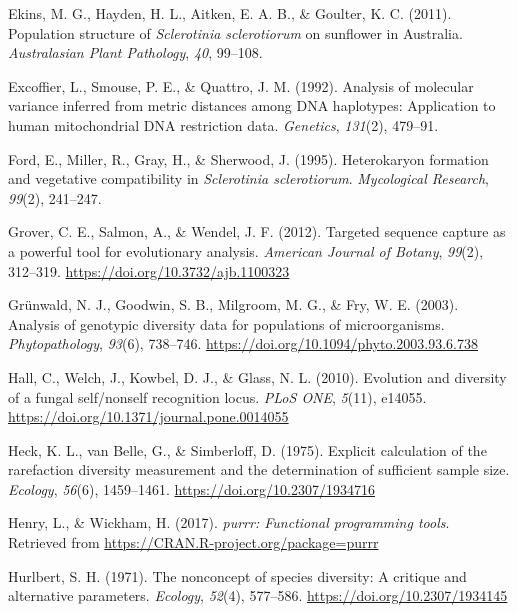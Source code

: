 \hypertarget{ref-ekins2011population}{}
Ekins, M. G., Hayden, H. L., Aitken, E. A. B., \& Goulter, K. C. (2011).
Population structure of \emph{Sclerotinia sclerotiorum} on sunflower in
Australia. \emph{Australasian Plant Pathology}, \emph{40}, 99--108.

\hypertarget{ref-excoffier1992analysis}{}
Excoffier, L., Smouse, P. E., \& Quattro, J. M. (1992). Analysis of
molecular variance inferred from metric distances among DNA haplotypes:
Application to human mitochondrial DNA restriction data.
\emph{Genetics}, \emph{131}(2), 479--91.

\hypertarget{ref-ford1995heterokaryon}{}
Ford, E., Miller, R., Gray, H., \& Sherwood, J. (1995). Heterokaryon
formation and vegetative compatibility in \emph{Sclerotinia
sclerotiorum}. \emph{Mycological Research}, \emph{99}(2), 241--247.

\hypertarget{ref-grover2012targeted}{}
Grover, C. E., Salmon, A., \& Wendel, J. F. (2012). Targeted sequence
capture as a powerful tool for evolutionary analysis. \emph{American
Journal of Botany}, \emph{99}(2), 312--319.
\url{https://doi.org/10.3732/ajb.1100323}

\hypertarget{ref-grunwald2003analysis}{}
Grünwald, N. J., Goodwin, S. B., Milgroom, M. G., \& Fry, W. E. (2003).
Analysis of genotypic diversity data for populations of microorganisms.
\emph{Phytopathology}, \emph{93}(6), 738--746.
\url{https://doi.org/10.1094/phyto.2003.93.6.738}

\hypertarget{ref-hall2010evolution}{}
Hall, C., Welch, J., Kowbel, D. J., \& Glass, N. L. (2010). Evolution
and diversity of a fungal self/nonself recognition locus. \emph{PLoS
ONE}, \emph{5}(11), e14055.
\url{https://doi.org/10.1371/journal.pone.0014055}

\hypertarget{ref-heck1975explicit}{}
Heck, K. L., van Belle, G., \& Simberloff, D. (1975). Explicit
calculation of the rarefaction diversity measurement and the
determination of sufficient sample size. \emph{Ecology}, \emph{56}(6),
1459--1461. \url{https://doi.org/10.2307/1934716}

\hypertarget{ref-purrr}{}
Henry, L., \& Wickham, H. (2017). \emph{purrr: Functional programming
tools}. Retrieved from \url{https://CRAN.R-project.org/package=purrr}

\hypertarget{ref-hurlbert1971nonconcept}{}
Hurlbert, S. H. (1971). The nonconcept of species diversity: A critique
and alternative parameters. \emph{Ecology}, \emph{52}(4), 577--586.
\url{https://doi.org/10.2307/1934145}

